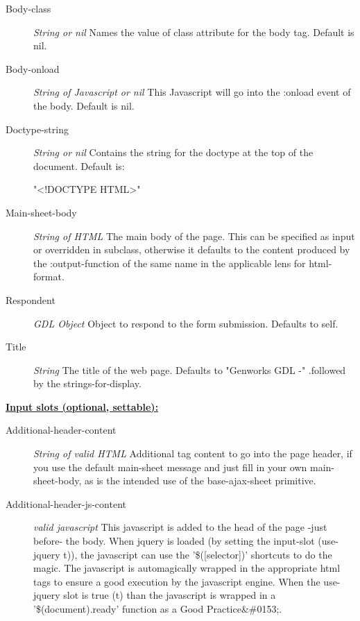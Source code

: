\documentclass [11pt]{book}
\begin{document}
\begin{itemize}
\begin{description}

\item [Body-class]
\emph{String or nil} Names the value of class attribute for the body tag. Default is nil.


\item [Body-onload]
\emph{String of Javascript or nil} This Javascript will go into the :onload event of the body.
Default is nil.


\item [Doctype-string]
\emph{String or nil} Contains the string for the doctype at the top of the document. Default is:

"<!DOCTYPE HTML>"


\item [Main-sheet-body]
\emph{String of HTML} The main body of the page.
This can be specified as input or overridden in subclass, otherwise it defaults
to the content produced by the :output-function of the same name
in the applicable lens for  html-format.


\item [Respondent]
\emph{GDL Object} Object to respond to the form submission. Defaults to self.


\item [Title]
\emph{String} The title of the web page. Defaults to "Genworks GDL -"
.followed by the strings-for-display.


\end{description}






\textbf{
\underline{Input slots (optional, settable):}}

\begin{description}

\item [Additional-header-content]
\emph{String of valid HTML} Additional tag content to go into the page header,
if you use the default main-sheet message and just fill in your own main-sheet-body, as
is the intended use of the base-ajax-sheet primitive.


\item [Additional-header-js-content]
\emph{valid javascript} This javascript is added to the head of the page -just before- the body.
When jquery is loaded (by setting the input-slot (use-jquery t)), the javascript can use the
'\$([selector])' shortcuts to do the magic. The javascript is automagically wrapped in the
appropriate html tags to ensure a good execution by the javascript engine. When the use-jquery
slot is true (t) than the javascript is wrapped in a '\$(document).ready' function as a
Good Practice&\#0153;.



\end{description}
\end{itemize}
\end{document}
